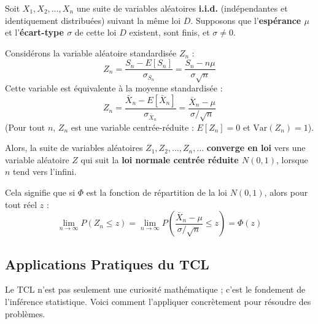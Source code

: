 \begin{theorembox}
Soit $X_1, X_2, \dots, X_n$ une suite de variables aléatoires \textbf{i.i.d.} (indépendantes et identiquement distribuées) suivant la même loi $D$.
Supposons que l'\textbf{espérance $\mu$} et l'\textbf{écart-type $\sigma$} de cette loi $D$ existent, sont finis, et $\sigma \neq 0$.

Considérons la variable aléatoire standardisée $Z_n$ :
$$ Z_n = \frac{S_n - E[S_n]}{\sigma_{S_n}} = \frac{S_n - n\mu}{\sigma\sqrt{n}} $$
Cette variable est équivalente à la moyenne standardisée :
$$ Z_n = \frac{\bar{X}_n - E[\bar{X}_n]}{\sigma_{\bar{X}_n}} = \frac{\bar{X}_n - \mu}{\sigma / \sqrt{n}} $$
(Pour tout $n$, $Z_n$ est une variable centrée-réduite : $E[Z_n] = 0$ et $\text{Var}(Z_n) = 1$).

Alors, la suite de variables aléatoires $Z_1, Z_2, \dots, Z_n, \dots$ \textbf{converge en loi} vers une variable aléatoire $Z$ qui suit la \textbf{loi normale centrée réduite $N(0, 1)$}, lorsque $n$ tend vers l'infini.

Cela signifie que si $\Phi$ est la fonction de répartition de la loi $N(0, 1)$, alors pour tout réel $z$ :
$$ \lim_{n \to \infty} P(Z_n \le z) = \lim_{n \to \infty} P\left( \frac{\bar{X}_n - \mu}{\sigma/\sqrt{n}} \le z \right) = \Phi(z) $$
\end{theorembox}

\subsection{Applications Pratiques du TCL}

Le TCL n'est pas seulement une curiosité mathématique ; c'est le fondement de l'inférence statistique. Voici comment l'appliquer concrètement pour résoudre des problèmes.

